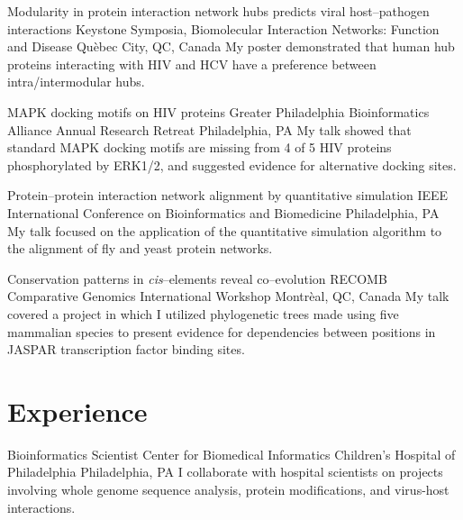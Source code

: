 \documentclass [10pt, letterpaper]{moderncv}
\begin{document}
         {Modularity in protein interaction network hubs predicts
          viral host--pathogen interactions}
         {Keystone Symposia, Biomolecular Interaction Networks: Function
          and Disease}
         {Qu\`{e}bec City, QC, Canada}
         {}
         {My poster demonstrated that human hub proteins 
          interacting with HIV and HCV
          have a preference between intra/intermodular hubs.}

         {MAPK docking motifs on HIV proteins}
         {Greater Philadelphia Bioinformatics Alliance Annual Research Retreat}
         {Philadelphia, PA}
         {}
         {My talk showed that standard MAPK docking motifs are
          missing from 4 of 5 HIV proteins phosphorylated by ERK1/2, 
          and suggested evidence
          for alternative docking sites.}

         {Protein--protein interaction network alignment by quantitative
          simulation}
         {IEEE International Conference on Bioinformatics and 
          Biomedicine}
         {Philadelphia, PA}
         {}
         {My talk focused on the application of the 
          quantitative simulation algorithm to the 
          alignment of fly and yeast
          protein networks.}

         {Conservation patterns in
  \emph{cis}--elements reveal co--evolution} 
         {RECOMB Comparative
  Genomics International Workshop} 
         {Montr\`{e}al, QC, Canada} 
         {} 
         {My talk covered a project in which I utilized phylogenetic trees made
          using five
          mammalian species to present evidence for dependencies between
          positions in JASPAR transcription factor binding sites.}

\section {Experience}

 {Bioinformatics Scientist} {Center for
  Biomedical Informatics} {Children's Hospital of Philadelphia}
         {Philadelphia, PA} {I collaborate with hospital scientists on
           projects involving whole genome sequence analysis, protein
           modifications, and virus-host interactions.}
\end{document}
